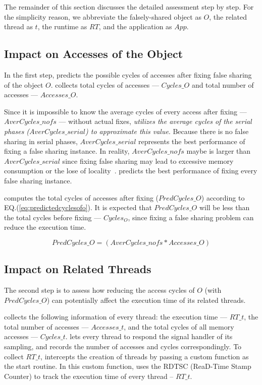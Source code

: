 The remainder of this section discusses the detailed assessment step by step. For the simplicity reason, we abbreviate the falsely-shared object as $O$, the related thread as $t$, the runtime as $RT$, and the application as $App$. 

\subsection{Impact on Accesses of the Object}
\label{sec:impactobject}

In the first step, \cheetah{} predicts the possible cycles of accesses after fixing false sharing of the object $O$.  \cheetah{} collects total cycles of accesses --- $Cycles\_O$ and total number of accesses --- $Accesses\_O$. 

Since it is impossible to know the average cycles of every access after fixing --- $AverCycles\_{nofs}$ --- without actual fixes, {\it \cheetah{} utilizes the average cycles of the serial phases ($AverCycles\_{serial}$) to approximate this value}. Because there is no false sharing in serial phases, $AverCycles\_{serial}$ represents the best performance of fixing a false sharing instance. In reality, $AverCycles\_{nofs}$ maybe is larger than $AverCycles\_{serial}$ since fixing false sharing may lead to excessive memory consumption or the lose of locality~\cite{qinzhao}. \cheetah{} predicts the best performance of fixing every false sharing instance. 
 
 \cheetah{} computes the total cycles of accesses after fixing ($PredCycles\_{O}$) according to EQ.(\ref{eq:predictedcyclesofo}).  It is expected that $PredCycles\_{O}$ will be less than the total cycles before fixing --- $Cycles_O$, since fixing a false sharing problem can reduce the execution time.  

\begin{equation}
\label{eq:predictedcyclesofo}
 PredCycles\_{O} = (AverCycles\_{nofs} * Accesses\_O)
\end{equation} 

\subsection{Impact on Related Threads}
\label{sec:impactthread}

The second step is to assess how reducing the access cycles of $O$ (with $PredCycles\_{O}$) can potentially affect the execution time of its related threads. 

\Cheetah{} collects the following information of every thread: the execution time --- $RT\_{t}$, the total number of accesses --- $Accesses\_{t}$, and the total cycles of all memory accesses --- $Cycles\_{t}$. \cheetah{} lets every thread to respond the signal handler of its sampling, and records the number of accesses and cycles correspondingly. To collect $RT\_{t}$, \cheetah{} intercepts the creation of threads by passing a custom function as the start routine. In this custom function, \cheetah{} uses the RDTSC (ReaD-Time Stamp Counter) to track the execution time of every thread -- $RT\_{t}$. 

